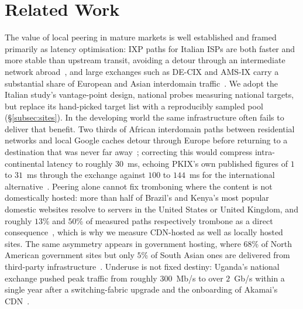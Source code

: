 \documentclass[sigconf,anonymous,10pt]{acmart}
\begin{document}


\section{Related Work}
\label{sec:related-work}
The value of local peering in mature markets is well established and framed primarily as latency optimisation: IXP paths for Italian ISPs are both faster and more stable than upstream transit, avoiding a detour through an intermediate network abroad~\cite{dibartolomeo2015}, and large exchanges such as DE-CIX and AMS-IX carry a substantial share of European and Asian interdomain traffic~\cite{ager2012, chatzis2013}. We adopt the Italian study's vantage-point design, national probes measuring national targets, but replace its hand-picked target list with a reproducibly sampled pool (\S\ref{subsec:sites}). In the developing world the same infrastructure often fails to deliver that benefit. Two thirds of African interdomain paths between residential networks and local Google caches detour through Europe before returning to a destination that was never far away~\cite{gupta2014}; correcting this would compress intra-continental latency to roughly 30~ms, echoing PKIX's own published figures of $1$ to $31$~ms through the exchange against $100$ to $144$~ms for the international alternative~\cite{pta2026}. Peering alone cannot fix tromboning where the content is not domestically hosted: more than half of Brazil's and Kenya's most popular domestic websites resolve to servers in the United States or United Kingdom, and roughly $13$\% and $50$\% of measured paths respectively trombone as a direct consequence~\cite{edmundson2016characterizing}, which is why we measure CDN-hosted as well as locally hosted sites. The same asymmetry appears in government hosting, where $68$\% of North American government sites but only $5$\% of South Asian ones are delivered from third-party infrastructure~\cite{kumar2024choices}. Underuse is not fixed destiny: Uganda's national exchange pushed peak traffic from roughly $300$~Mb/s to over $2$~Gb/s within a single year after a switching-fabric upgrade and the onboarding of Akamai's CDN~\cite{obriain2017rebuilding}.
\end{document}
